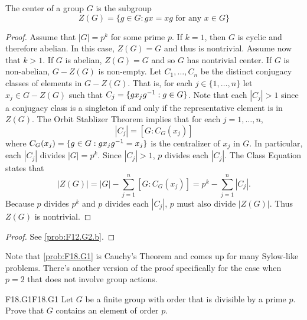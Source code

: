 \documentclass[../../AlgebraQualSolutions.tex]{subfiles}
\begin{document}
    The center of a group $G$ is the subgroup
        \[Z(G) = \{g \in G: gx = xg \textrm{ for any $x \in G$} \} \]
    
    \begin{proof}
    Assume that $|G| = p^k$ for some prime $p$. If $k = 1$, then $G$ is cyclic and therefore abelian. In this case, $Z(G) = G$ and thus is nontrivial. Assume now that $k > 1$. If $G$ is abelian, $Z(G) = G$ and so $G$ has nontrivial center. If $G$ is non-abelian, $G - Z(G)$ is non-empty. Let $C_1, \ldots, C_n$ be the distinct conjugacy classes of elements in $G - Z(G)$. That is, for each $j \in \{1, \ldots, n\}$ let $x_j \in G - Z(G)$ such that $C_j = \{gx_jg^{-1}: g \in G\}$. Note that each $|C_j| > 1$ since a conjugacy class is a singleton if and only if the representative element is in $Z(G)$. The Orbit Stablizer Theorem implies that for each $j = 1, \ldots, n$,
        \[ |C_j| =  [G: C_G(x_j)] \]
    where $C_G(x_j) = \{g \in G: gx_jg^{-1} = x_j \}$ is the centralizer of $x_j$ in $G$. In particular, each $|C_j|$ divides $|G| = p^k$. Since $|C_j| > 1$, $p$ divides each $|C_j|$. The Class Equation states that 
        \[|Z(G)| = |G| - \sum_{j=1}^n [G: C_G(x_j)] = p^k -  \sum_{j=1}^n |C_j| .\]
    Because $p$ divides $p^k$ and $p$ divides each $|C_j|$, $p$ must also divide $|Z(G)|$. Thus $Z(G)$ is nontrivial.
    \end{proof}
    
    \begin{proof}
        See \ref{prob:F12.G2.b}.
    \end{proof}
    
    Note that \ref{prob:F18.G1} is Cauchy's Theorem and comes up for many Sylow-like problems. There's another version of the proof specifically for the case when $p = 2$ that does not involve group actions.
    
        \begin{prob}{F18.G1}{F18.G1}
        Let $G$ be a finite group with order that is divisible by a prime $p$. Prove that $G$ contains an element of order $p$.
        \end{prob}
        
\end{document}
